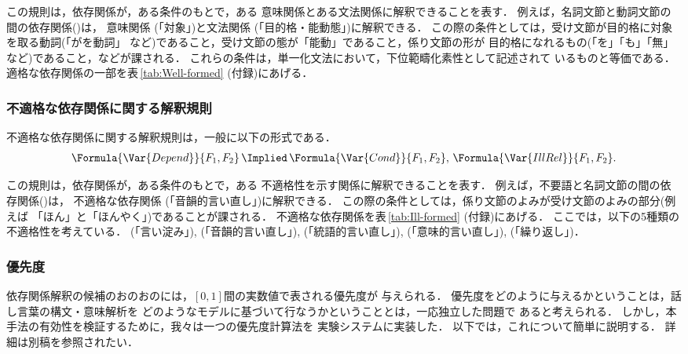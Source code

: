 この規則は，依存関係が，ある条件のもとで，ある
意味関係とある文法関係に解釈できることを表す．
例えば，名詞文節と動詞文節の間の依存関係()は，
意味関係 (「対象」)と文法関係
(「目的格・能動態」)に解釈できる．
この際の条件としては，受け文節が目的格に対象を取る動詞(「がを動詞」
など)であること，受け文節の態が「能動」であること，係り文節の形が
目的格になれるもの(「を」「も」「無」など)であること，などが課される．
これらの条件は，単一化文法において，下位範疇化素性として記述されて
いるものと等価である．
適格な依存関係の一部を表\,\ref{tab:Well-formed} (付録)にあげる．

\subsubsection{不適格な依存関係に関する解釈規則}
\label{sec:Uniform:Depend:Ill-formed}

不適格な依存関係に関する解釈規則は，一般に以下の形式である．
\begin{equation}\label{eq:Ill-formed}
\begin{array}[t]{@{}l@{}}
  \Formula{\Var{Depend}}{F_1,F_2}\,\Implied\,
\Formula{\Var{Cond}}{F_1,F_2},\,
\Formula{\Var{IllRel}}{F_1,F_2}.
\end{array}
\end{equation}

この規則は，依存関係が，ある条件のもとで，ある
不適格性を示す関係に解釈できることを表す．
例えば，不要語と名詞文節の間の依存関係()は，
不適格な依存関係 (「音韻的言い直し」)に解釈できる．
この際の条件としては，係り文節のよみが受け文節のよみの部分(例えば
「ほん」と「ほんやく」)であることが課される．
不適格な依存関係を表\,\ref{tab:Ill-formed} (付録)にあげる．
ここでは，以下の5種類の不適格性を考えている．
 (「言い淀み」),  (「音韻的言い直し」),
 (「統語的言い直し」), 
(「意味的言い直し」),  (「繰り返し」)．

\subsubsection{優先度}\label{sec:Uniform:Depend:Preference}

依存関係解釈の候補のおのおのには，$[0,1]$間の実数値で表される優先度が
与えられる．
優先度をどのように与えるかということは，話し言葉の構文・意味解析を
どのようなモデルに基づいて行なうかということとは，一応独立した問題で
あると考えられる．
しかし，本手法の有効性を検証するために，我々は一つの優先度計算法を
実験システムに実装した．
以下では，これについて簡単に説明する．
詳細は別稿\cite{伝:言処-投稿中}を参照されたい．

